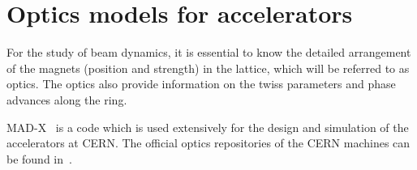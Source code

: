 


\section{Optics models for accelerators}\label{sec:optics_model_designs}
For the study of beam dynamics, it is essential to know the detailed arrangement of the magnets (position and strength) in the lattice, which will be referred to as optics. The optics also provide information on the twiss parameters and phase advances along the ring.

MAD-X~\cite{madx} is a code which is used extensively for the design and simulation of the accelerators at CERN. The official optics repositories of the CERN machines can be found in~\cite{cern_optics_repo}.

